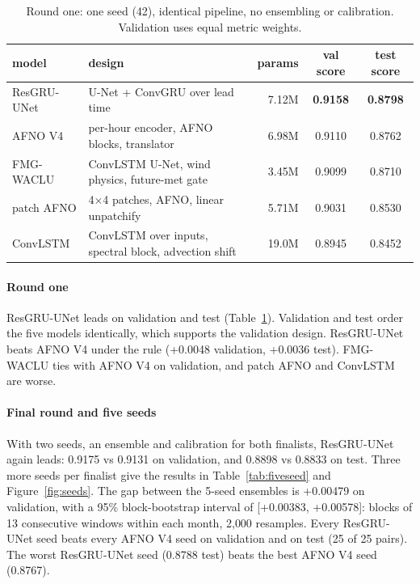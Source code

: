 \documentclass[10pt]{article}
\begin{document}
\begin{table}[t]
\caption{Round one: one seed (42), identical pipeline, no ensembling or calibration. Validation uses equal metric weights.}
\label{tab:round1}
\centering\small
\begin{tabular}{@{}l l r c c@{}}
\toprule
model & design & params & val score & test score \\
\midrule
ResGRU-UNet & U-Net + ConvGRU over lead time & 7.12M & \textbf{0.9158} & \textbf{0.8798} \\
AFNO V4 & per-hour encoder, AFNO blocks, translator & 6.98M & 0.9110 & 0.8762 \\
FMG-WACLU & ConvLSTM U-Net, wind physics, future-met gate & 3.45M & 0.9099 & 0.8710 \\
patch AFNO & 4$\times$4 patches, AFNO, linear unpatchify & 5.71M & 0.9031 & 0.8530 \\
ConvLSTM & ConvLSTM over inputs, spectral block, advection shift & 19.0M & 0.8945 & 0.8452 \\
\bottomrule
\end{tabular}
\end{table}

\paragraph{Round one}
ResGRU-UNet leads on validation and test (Table~\ref{tab:round1}). Validation and test order the five models identically, which supports the validation design. ResGRU-UNet beats AFNO V4 under the rule (+0.0048 validation, +0.0036 test). FMG-WACLU ties with AFNO V4 on validation, and patch AFNO and ConvLSTM are worse.

\paragraph{Final round and five seeds}
With two seeds, an ensemble and calibration for both finalists, ResGRU-UNet again leads: 0.9175 vs 0.9131 on validation, and 0.8898 vs 0.8833 on test. Three more seeds per finalist give the results in Table~\ref{tab:fiveseed} and Figure~\ref{fig:seeds}. The gap between the 5-seed ensembles is +0.00479 on validation, with a 95\% block-bootstrap interval of [+0.00383, +0.00578]: blocks of 13 consecutive windows within each month, 2{,}000 resamples. Every ResGRU-UNet seed beats every AFNO V4 seed on validation and on test (25 of 25 pairs). The worst ResGRU-UNet seed (0.8788 test) beats the best AFNO V4 seed (0.8767).
\end{document}
